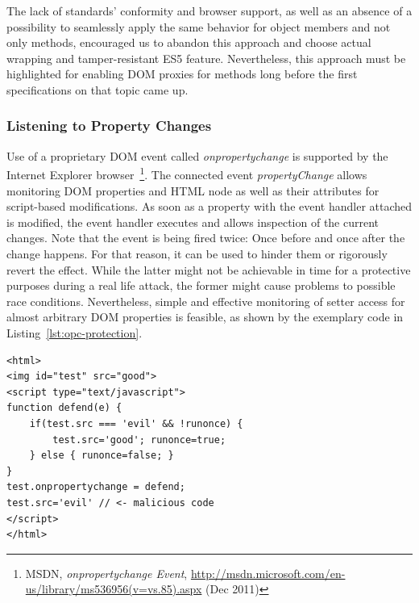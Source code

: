       The lack of standards' conformity and browser support, as well as an absence of a possibility to seamlessly apply the same behavior for object members and not only methods, encouraged us to abandon this approach and choose actual wrapping and tamper-resistant ES5 feature. Nevertheless, this approach must be highlighted for enabling DOM proxies for methods long before the first specifications on that topic came up.

      \subsubsection{Listening to Property Changes}
      \label{subsubsubsec:6.3.1.3.listening_to_property_changes}

      Use of a proprietary DOM event called \textit{onpropertychange} is supported by the Internet Explorer browser~\footnote{MSDN, \textit{onpropertychange Event}, \url{http://msdn.microsoft.com/en-us/library/ms536956(v=vs.85).aspx} (Dec 2011)}. The connected event \textit{propertyChange} allows monitoring DOM properties and HTML node as well as their attributes for script-based modifications. As soon as a property with the event handler attached is modified, the event handler executes and allows inspection of the current changes. Note that the event is being fired twice: Once before and once after the change happens. For that reason, it can be used to hinder them or rigorously revert the effect. While the latter might not be achievable in time for a protective purposes during a real life attack, the former might cause problems to possible race conditions. Nevertheless, simple and effective monitoring of setter access for almost arbitrary DOM properties is feasible, as shown by the exemplary code in Listing~\ref{lst:opc-protection}.\\

\begin{lstlisting}[captionpos=b,label=lst:opc-protection,caption=Protecting DOM property setter access with the onpropertychange event handler]
<html>
<img id="test" src="good">
<script type="text/javascript">
function defend(e) {
	if(test.src === 'evil' && !runonce) { 
		test.src='good'; runonce=true;
	} else { runonce=false; }
}
test.onpropertychange = defend;
test.src='evil' // <- malicious code
</script>
</html>
\end{lstlisting}

